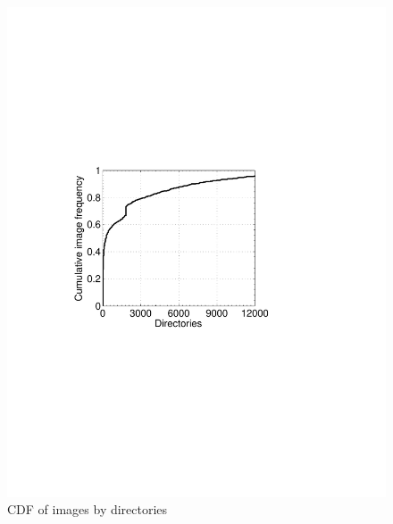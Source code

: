 \begin{figure}
	\centering
	\begin{minipage}{0.27\textwidth}
		\centering
		\includegraphics[width=1\textwidth]{graphs/dir.pdf}
		\caption{CDF of images by directories}
		\label{fig-dir}
	\end{minipage}%
	\begin{minipage}{0.23\textwidth}
		\centering

\end{minipage}
\end{figure}
